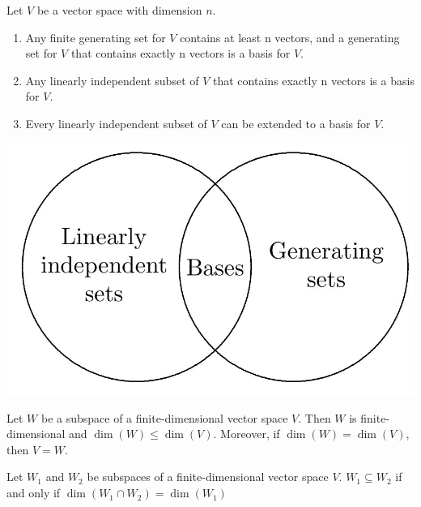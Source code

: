 \begin{cor}%
	Let $V$ be a vector space with dimension $n$.
	\begin{enumerate}
		\item Any finite generating set for $V$ contains at least n vectors, and a generating set for $V$ that contains exactly n vectors is a basis for $V$.
		\item Any linearly independent subset of $V$ that contains exactly n vectors is a basis for $V$.
		\item Every linearly independent subset of $V$ can be extended to a basis for $V$.
	\end{enumerate}
\end{cor}

%


\begin{center}
		\includegraphics[scale = 0.25]{./figure/49.jpg}
\end{center}


\begin{thm} %
Let $W$ be a subspace of a finite-dimensional vector space $V$. Then $W$ is finite-dimensional and $\dim(W) \leq \dim(V)$. Moreover, if $\dim(W) = \dim(V)$, then $V = W$.
\end{thm}




\begin{prop} %
	Let $W_1$ and $W_2$ be subspaces of a finite-dimensional vector space $V$. $W_1 \subseteq W_2$ if and only if $\dim(W_1 \cap W_2) = \dim(W_1)$
\end{prop}



